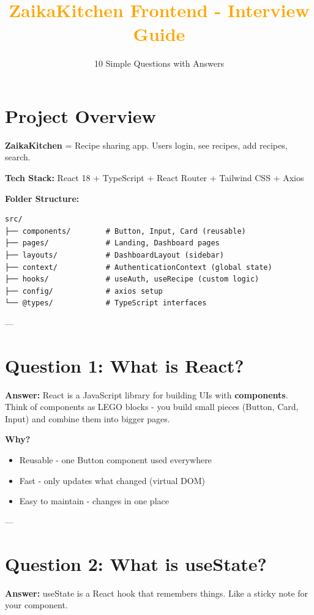 \documentclass[11pt]{article}
\title{\textcolor{orange}{\textbf{ZaikaKitchen Frontend - Interview Guide}}}
\author{10 Simple Questions with Answers}
\date{}
\begin{document}
\maketitle

\section*{Project Overview}

\textbf{ZaikaKitchen} = Recipe sharing app. Users login, see recipes, add recipes, search.

\textbf{Tech Stack:} React 18 + TypeScript + React Router + Tailwind CSS + Axios

\textbf{Folder Structure:}
\begin{lstlisting}
src/
├── components/        # Button, Input, Card (reusable)
├── pages/             # Landing, Dashboard pages
├── layouts/           # DashboardLayout (sidebar)
├── context/           # AuthenticationContext (global state)
├── hooks/             # useAuth, useRecipe (custom logic)
├── config/            # axios setup
└── @types/            # TypeScript interfaces
\end{lstlisting}

---

\section*{Question 1: What is React?}

\textbf{Answer:} React is a JavaScript library for building UIs with \textbf{components}. Think of components as LEGO blocks - you build small pieces (Button, Card, Input) and combine them into bigger pages.

\textbf{Why?} 
\begin{itemize}
    \item Reusable - one Button component used everywhere
    \item Fast - only updates what changed (virtual DOM)
    \item Easy to maintain - changes in one place
\end{itemize}

---

\section*{Question 2: What is useState?}

\textbf{Answer:} useState is a React hook that remembers things. Like a sticky note for your component.
\end{document}
